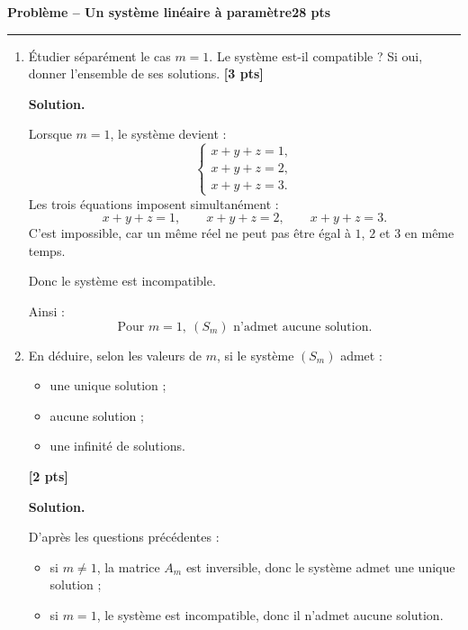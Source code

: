 \documentclass[11pt,a4paper]{article}
\newcommand{\pts}[1]{\hfill \textbf{[#1 pts]}}
\newcounter{probleme}
\newenvironment{probleme}[2]{
    \refstepcounter{probleme}
    \vspace{0.6cm}
    {\Large\color{bleu}\textbf{Problème \theprobleme{} -- #1}}\hfill \textbf{#2 pts}
    \par\medskip
    \hrule
    \medskip
}{\vspace{0.5cm}}
\newcommand{\solution}{
    \textbf{\color{bleu}Solution. }
}
\begin{document}
\begin{probleme}{Un système linéaire à paramètre}{28}
\begin{enumerate}
    De même, on soustrait la première équation à la troisième :
    \[
    (x+y+mz)-(x+y+z)=3-1.
    \]
    Donc :
    \[
    (m-1)z=2.
    \]
    Comme \(m\neq 1\), on obtient :
    \[
    z=\frac{2}{m-1}.
    \]

    Il reste à utiliser la première équation :
    \[
    x+y+z=1.
    \]
    Ainsi :
    \[
    x=1-y-z
    =
    1-\frac{1}{m-1}-\frac{2}{m-1}
    =
    1-\frac{3}{m-1}.
    \]
    Donc :
    \[
    x=\frac{m-1}{m-1}-\frac{3}{m-1}
    =
    \frac{m-4}{m-1}.
    \]

    Finalement, pour \(m\neq 1\), l'unique solution est :
    \[
    \boxed{
    (x,y,z)
    =
    \left(
    \frac{m-4}{m-1},
    \frac{1}{m-1},
    \frac{2}{m-1}
    \right).}
    \]

    \item Étudier séparément le cas \(m=1\).
    Le système est-il compatible ? Si oui, donner l'ensemble de ses solutions. \pts{3}

    \solution

    Lorsque \(m=1\), le système devient :
    \[
    \begin{cases}
    x+y+z=1,\\
    x+y+z=2,\\
    x+y+z=3.
    \end{cases}
    \]
    Les trois équations imposent simultanément :
    \[
    x+y+z=1,\qquad x+y+z=2,\qquad x+y+z=3.
    \]
    C'est impossible, car un même réel ne peut pas être égal à \(1\), \(2\) et \(3\) en même temps.

    Donc le système est incompatible.

    Ainsi :
    \[
    \boxed{\text{Pour }m=1,\ (S_m)\text{ n'admet aucune solution.}}
    \]

    \item En déduire, selon les valeurs de \(m\), si le système \((S_m)\) admet :
    \begin{itemize}
        \item une unique solution ;
        \item aucune solution ;
        \item une infinité de solutions.
    \end{itemize}
    \pts{2}

    \solution

    D'après les questions précédentes :
    \begin{itemize}
        \item si \(m\neq 1\), la matrice \(A_m\) est inversible, donc le système admet une unique solution ;
        \item si \(m=1\), le système est incompatible, donc il n'admet aucune solution.
    \end{itemize}


\end{enumerate}
\end{probleme}
\end{document}
